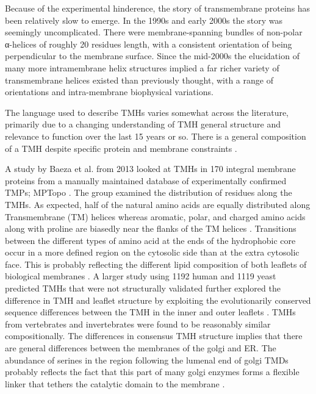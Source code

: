 \documentclass[12pt,PhD,twoside]{muthesis}
\begin{document}
Because of the experimental hinderence, the story of transmembrane proteins has been relatively slow to emerge. In the 1990s and early 2000s the story was seemingly uncomplicated. There were membrane-spanning bundles of non-polar α-helices of roughly 20 residues length, with a consistent orientation of being perpendicular to the membrane surface. Since the mid-2000s the elucidation of many more intramembrane helix structures implied a far richer variety of transmembrane helices existed than previously thought, with a range of orientations and intra-membrane biophysical variations.

The language used to describe TMHs varies somewhat across the literature, primarily due to a changing understanding of TMH general structure and relevance to function over the last 15 years or so. There is a general composition of a TMH despite specific protein and membrane constraints \cite{Sharpe2010}.

A study by Baeza et al. from 2013 \cite{Baeza-Delgado2013} looked at TMHs in 170 integral membrane proteins from a manually maintained database of experimentally confirmed TMPs; MPTopo \cite{Jayasinghe2001}. The group examined the distribution of residues along the TMHs. As expected, half of the natural amino acids are equally distributed along Transmembrane (TM) helices whereas aromatic, polar, and charged amino acids along with proline are biasedly near the flanks of the TM helices \cite{Baeza-Delgado2013}. Transitions between the different types of amino acid at the ends of the hydrophobic core occur in a more defined region on the cytosolic side than at the extra cytosolic face. This is probably reflecting the different lipid composition of both leaflets of biological membranes \cite{Baeza-Delgado2013}. A larger study using 1192 human and 1119 yeast predicted TMHs that were not structurally validated further explored the difference in TMH and leaflet structure by exploiting the evolutionarily conserved sequence differences between the TMH in the inner and outer leaflets \cite{Sharpe2010}. TMHs from vertebrates and invertebrates were found to be reasonably similar compositionally. The differences in consensus TMH structure implies that there are general differences between the membranes of the golgi and ER. The abundance of serines in the region following the lumenal end of golgi TMDs probably reflects the fact that this part of many golgi enzymes forms a flexible linker that tethers the catalytic domain to the membrane \cite{Sharpe2010}.
\end{document}
